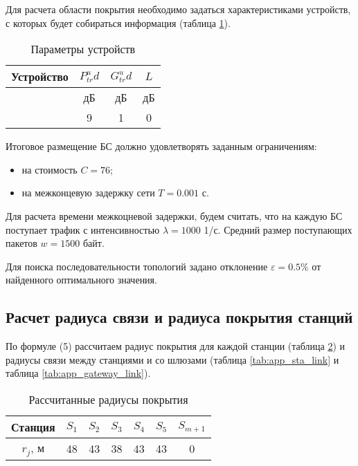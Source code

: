 Для расчета области покрытия необходимо задаться характеристиками устройств, с которых будет собираться информация (таблица \cref{tab:app_user_device_parameters}).


\begin{table}[h!]\centering
  \begin{tabular}{|c||c|c|c|}\hline
      
    Устройство&	$P_{tr}^ud$&	$G_{tr}^ud$&	$L$ \\
    \hline
    &	дБ&	дБ&	дБ	 \\
    \hline
    &	9&	1&	0 \\

    \hline

\end{tabular}\caption{Параметры устройств}\label{tab:app_user_device_parameters}
\end{table}


Итоговое размещение БС должно удовлетворять заданным ограничениям:
\begin{itemize}
  \item на стоимость $C = 76$;
  \item на межконцевую задержку сети $T =0.001$ с.
\end{itemize}
Для расчета времени межкоцневой задержки, будем считать, что на каждую БС поступает трафик с интенсивностью $\lambda = 1000$ 1/с. Средний размер поступающих пакетов $w=1500$ байт.

Для поиска последовательности топологий задано отклонение $\varepsilon=0.5$\% от найденного оптимального значения.

\subsection{Расчет радиуса связи и радиуса покрытия станций}

По формуле (5) рассчитаем радиус покрытия для каждой станции (таблица \cref{tab:app_sta_coverage}) и радиусы связи между станциями и со шлюзами (таблица \cref{tab:app_sta_link} и таблица \cref{tab:app_gateway_link}).

\begin{table}[h!]\centering
  \begin{tabular}{|c||c c c c c c|}\hline
      
      Станция&	$S_1$& $S_2$& $S_3$& $S_4$& $S_5$& $S_{m+1}$\\
      \hline
      $r_j$, м&	48&	43&	38&	43&	43&	0\\
      \hline

\end{tabular}\caption{Рассчитанные радиусы покрытия}\label{tab:app_sta_coverage}
\end{table}


